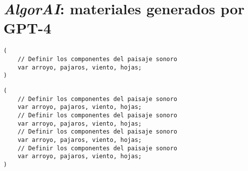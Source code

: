 \chapter{\emph{AlgorAI}: materiales generados por GPT-4}
\label{anexo:algorai}

\begin{minipage}[t]{.48\textwidth}
    \begin{lstlisting}[style=SuperCollider-IDE, basicstyle=\footnotesize\ttfamily, numbers=none]
(
    // Definir los componentes del paisaje sonoro
    var arroyo, pajaros, viento, hojas;
)          
    \end{lstlisting}
\end{minipage}\hfill
\begin{minipage}[t]{.48\textwidth}
    \begin{lstlisting}[style=SuperCollider-IDE, basicstyle=\footnotesize\ttfamily, numbers=none]
(
    // Definir los componentes del paisaje sonoro
    var arroyo, pajaros, viento, hojas;
    // Definir los componentes del paisaje sonoro
    var arroyo, pajaros, viento, hojas;
    // Definir los componentes del paisaje sonoro
    var arroyo, pajaros, viento, hojas;
    // Definir los componentes del paisaje sonoro
    var arroyo, pajaros, viento, hojas;
)          
    \end{lstlisting}
\end{minipage}

\vspace{20pt} %

